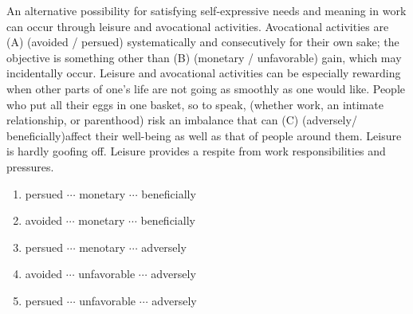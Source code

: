 \documentclass[a4wide,14pt]{extarticle}
\begin{document}
\begin{enumerate}[label=$\spadesuit$]
\begin{tcolorbox}

	An alternative possibility for satisfying self-expressive needs and meaning in work
	can occur through leisure and avocational activities. Avocational activities are
	(A) (avoided / persued) systematically and consecutively for their own sake; the
	objective is something other than (B) (monetary / unfavorable) gain, which may
	incidentally occur. Leisure and avocational activities can be especially rewarding
	when other parts of one's life are not going as smoothly as one would like. People
	who put all their eggs in one basket, so to speak, (whether work, an intimate
	relationship, or parenthood) risk an imbalance that can (C) (adversely/ beneficially)affect their well-being as well as that of people around them. Leisure is hardly goofing off. Leisure provides a respite from work responsibilities and pressures.

\end{tcolorbox}

	\begin{enumerate}[label={(\arabic*)}, start=1]
		\item persued $\cdots$ monetary $\cdots$ beneficially
		\item avoided $\cdots$ monetary $\cdots$ beneficially
		\item persued $\cdots$ menotary $\cdots$ adversely
		\item avoided $\cdots$ unfavorable $\cdots$ adversely
		\item persued $\cdots$ unfavorable $\cdots$ adversely
	\end{enumerate}

\end{enumerate}
\end{document}
